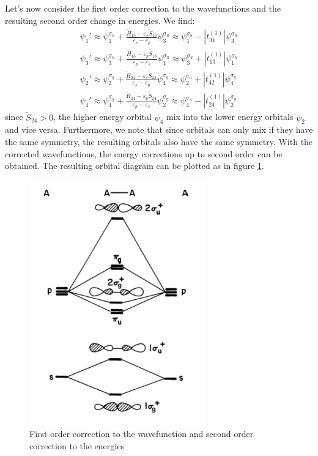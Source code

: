 \documentclass{article}
\newcommand{\order}[2]{#1^{(#2)}}
\begin{document}
Let's now consider the first order correction to the wavefunctions and the resulting 
second order change in energies. We find:
\begin{align}
    \psi_1' \approx  \psi_1^{\sigma_u} + \frac{\tilde{H}_{13} - \varepsilon_s \tilde{S}_{13}}{\varepsilon_s - \varepsilon_p} \psi_3^{\sigma_u} 
            \approx \psi_1^{\sigma_u} - |\order{t_{31}}{1}| \psi_3^{\sigma_u} \\ 
    \psi_3' \approx  \psi_3^{\sigma_u} + \frac{\tilde{H}_{13} - \varepsilon_p \tilde{S}_{13}}{\varepsilon_p - \varepsilon_s} \psi_1^{\sigma_u}
            \approx \psi_3^{\sigma_u} + |\order{t_{13}}{1}| \psi_1^{\sigma_u} \\ 
    \psi_2' \approx  \psi_2^{\sigma_g} + \frac{\tilde{H}_{24} - \varepsilon_s \tilde{S}_{24}}{\varepsilon_s - \varepsilon_p} \psi_4^{\sigma_g} 
            \approx \psi_2^{\sigma_u} + |\order{t_{42}}{1}| \psi_4^{\sigma_g} \\ 
    \psi_4' \approx  \psi_4^{\sigma_g} + \frac{\tilde{H}_{24} - \varepsilon_p \tilde{S}_{24}}{\varepsilon_p - \varepsilon_s} \psi_2^{\sigma_g} 
            \approx \psi_4^{\sigma_u} - |\order{t_{24}}{1}| \psi_2^{\sigma_g}
\end{align}
since $\tilde{S}_{24} > 0$, the higher energy orbital $\psi_4$ mix into the lower energy orbitals $\psi_2$ and vice versa. Furthermore, we note 
that since orbitals can only mix if they have the same symmetry, the resulting orbitals also have the same symmetry. With the 
corrected wavefunctions, the energy corrections up to second order can be obtained. 
The resulting orbital diagram can be plotted as in figure \ref{F:A2_second_order}. 

\begin{figure}
    \centering
    \includegraphics[width=3in]{F_A2_second_order.png}
    \caption{First order correction to the wavefunction and second order correction to the energies}
    \label{F:A2_second_order}
\end{figure}
\end{document}

